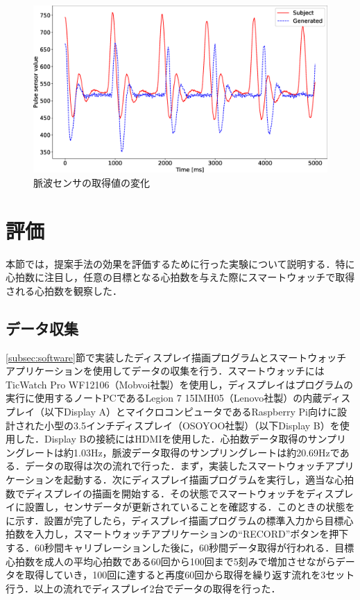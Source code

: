 \documentclass[Japanese,noauthor]{dicomopapers}
\begin{document}
\begin{figure}[!t]
	\begin{center}
		\includegraphics[width=1\linewidth]{figures/preliminary_pulse.eps}
	\end{center}
	\caption{脈波センサの取得値の変化}
	\label{fig:preliminary_pulse}
\end{figure}



\section{評価}
\label{sec:evaluation}
本節では，提案手法の効果を評価するために行った実験について説明する．特に心拍数に注目し，任意の目標となる心拍数を与えた際にスマートウォッチで取得される心拍数を観察した．


\subsection{データ収集}
\ref{subsec:software}節で実装したディスプレイ描画プログラムとスマートウォッチアプリケーションを使用してデータの収集を行う．スマートウォッチにはTicWatch Pro WF12106（Mobvoi社製）を使用し，ディスプレイはプログラムの実行に使用するノートPCであるLegion 7 15IMH05（Lenovo社製）の内蔵ディスプレイ（以下Display A）とマイクロコンピュータであるRaspberry Pi向けに設計された小型の3.5インチディスプレイ（OSOYOO社製）（以下Display B）を使用した．Display Bの接続にはHDMIを使用した．心拍数データ取得のサンプリングレートは約1.03Hz，脈波データ取得のサンプリングレートは約20.69Hzである．データの取得は次の流れで行った．まず，実装したスマートウォッチアプリケーションを起動する．次にディスプレイ描画プログラムを実行し，適当な心拍数でディスプレイの描画を開始する．その状態でスマートウォッチをディスプレイに設置し，センサデータが更新されていることを確認する．このときの状態をに示す．設置が完了したら，ディスプレイ描画プログラムの標準入力から目標心拍数を入力し，スマートウォッチアプリケーションの``RECORD''ボタンを押下する．60秒間キャリブレーションした後に，60秒間データ取得が行われる．目標心拍数を成人の平均心拍数である60回から100回\cite{heart_rate_average}まで5刻みで増加させながらデータを取得していき，100回に達すると再度60回から取得を繰り返す流れを3セット行う．以上の流れでディスプレイ2台でデータの取得を行った．
\end{document}
